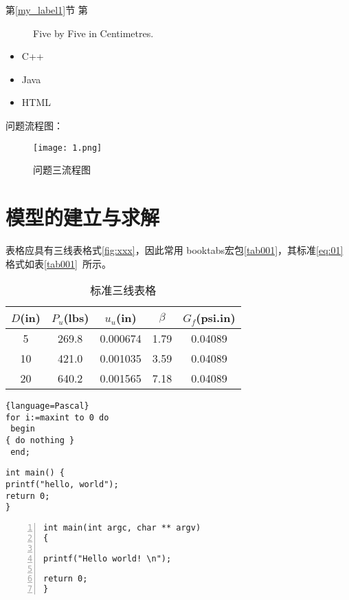 \documentclass[withoutpreface,bwprint]{cumcmthesis} %
\begin{document}
第\ref{my_label1}节
第\pageref{my_label1}


\begin{figure}[!thbp]
\makebox[\textwidth]{\framebox[5cm]{\rule{0pt}{5cm}}}
\caption{Five by Five in Centimetres.} \label{white}
\label{fig:xxx}
\end{figure}

\begin{itemize}
	\item C++\cite{pa}
	\item Java
	\item HTML
\end{itemize}

\clearpage

问题流程图：
\begin{figure}[!thbp] 
\centering
\texttt{[image: 1.png]}
\caption{问题三流程图}
\end{figure}

\clearpage

\section{模型的建立与求解}

表格应具有三线表格式\autoref{fig:xxx}，因此常用 booktabs宏包\autoref{tab001}，其标准\autoref{eq:01}格式如表\ref{tab001}~所示。
\begin{table}[!htbp]
\caption{标准三线表格}\label{tab001} \centering
\begin{tabular}{ccccc} 
\toprule[1.5pt]
\label{my_table1}
$D$(in) & $P_u$(lbs) & $u_u$(in) & $\beta$ & $G_f$(psi.in)\\
\midrule[1pt]
 5 & 269.8 & 0.000674 & 1.79 & 0.04089\\
10 & 421.0 & 0.001035 & 3.59 & 0.04089\\
20 & 640.2 & 0.001565 & 7.18 & 0.04089\\
\bottomrule[1.5pt]
\end{tabular}
\end{table}

\begin{lstlisting}{language=Pascal}
for i:=maxint to 0 do
 begin
{ do nothing }
 end;
\end{lstlisting}

\begin{verbatim}
int main() {
printf("hello, world");
return 0;
}
\end{verbatim}

\begin{lstlisting}[language={[ANSI]C},numbers=left,numberstyle=\tiny,keywordstyle=\color{blue!70},commentstyle=\color{red!50!green!50!blue!50},frame=shadowbox, rulesepcolor=\color{red!20!green!20!blue!20}] 
int main(int argc, char ** argv) 
{ 

printf("Hello world! \n"); 

return 0; 
} 
\end{lstlisting}
\end{document}
